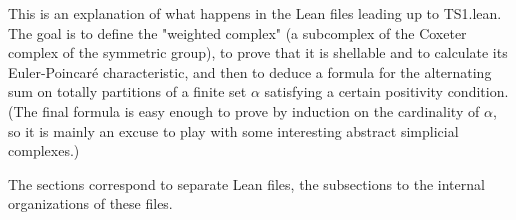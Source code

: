 



This is an explanation of what happens in the Lean files leading up to TS1.lean. The goal is to define the "weighted complex" (a subcomplex of the Coxeter complex of the
symmetric group), to prove that it is shellable and to calculate its Euler-Poincaré characteristic, and then to deduce a formula for the alternating sum on totally partitions
of a finite set $\alpha$ satisfying a certain positivity condition. (The final formula is easy enough to prove by induction on the cardinality of $\alpha$, so it is mainly
an excuse to play with some interesting abstract simplicial complexes.)


The sections correspond to separate Lean files, the subsections to the
internal organizations of these files.









